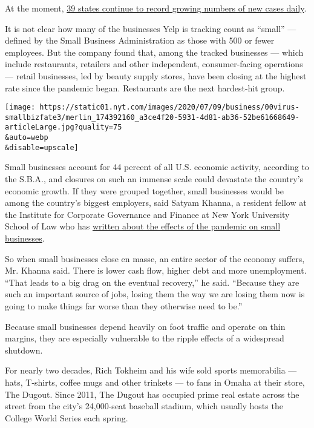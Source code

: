 At the moment,
\href{https://www.nytimes.com/2020/07/13/world/coronavirus-updates.html?action=click\&module=Top\%20Stories\&pgtype=Homepage\#link-609d3a0e}{39
states continue to record growing numbers of new cases daily}.

It is not clear how many of the businesses Yelp is tracking count as
``small'' --- defined by the Small Business Administration as those with
500 or fewer employees. But the company found that, among the tracked
businesses --- which include restaurants, retailers and other
independent, consumer-facing operations --- retail businesses, led by
beauty supply stores, have been closing at the highest rate since the
pandemic began. Restaurants are the next hardest-hit group.

\texttt{[image: https://static01.nyt.com/images/2020/07/09/business/00virus-smallbizfate3/merlin\_174392160\_a3ce4f20-5931-4d81-ab36-52be61668649-articleLarge.jpg?quality=75\\\&auto=webp\\\&disable=upscale]}

Small businesses account for 44 percent of all U.S. economic activity,
according to the S.B.A., and closures on such an immense scale could
devastate the country's economic growth. If they were grouped together,
small businesses would be among the country's biggest employers, said
Satyam Khanna, a resident fellow at the Institute for Corporate
Governance and Finance at New York University School of Law who has
\href{https://www.nytimes.com/2020/03/24/opinion/coronavirus-small-businesses.html}{written
about the effects of the pandemic on small businesses}.

So when small businesses close en masse, an entire sector of the economy
suffers, Mr. Khanna said. There is lower cash flow, higher debt and more
unemployment. ``That leads to a big drag on the eventual recovery,'' he
said. ``Because they are such an important source of jobs, losing them
the way we are losing them now is going to make things far worse than
they otherwise need to be.''

Because small businesses depend heavily on foot traffic and operate on
thin margins, they are especially vulnerable to the ripple effects of a
widespread shutdown.

For nearly two decades, Rich Tokheim and his wife sold sports
memorabilia --- hats, T-shirts, coffee mugs and other trinkets --- to
fans in Omaha at their store, The Dugout. Since 2011, The Dugout has
occupied prime real estate across the street from the city's 24,000-seat
baseball stadium, which usually hosts the College World Series each
spring.

